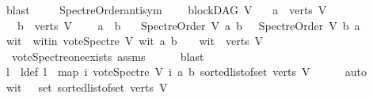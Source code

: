 \begin{isabellebody}
\ blast\ \isanewline
\ \ \isamarkupfalse%
\isanewline
{}\isamarkupfalse%
%
\endisatagproof
{\isafoldproof}%
%
\isadelimproof
\isanewline
%
\endisadelimproof
\isanewline
{}\isamarkupfalse%
\ Spectre{\isacharunderscore}{\kern0pt}Order{\isacharunderscore}{\kern0pt}antisym{\isacharcolon}{\kern0pt}\ \isanewline
\ \ \ {\isachardoublequoteopen}blockDAG\ V{\isachardoublequoteclose}\isanewline
\ \ \ {\isachardoublequoteopen}a\ {\isasymin}\ verts\ V{\isachardoublequoteclose}\ \isanewline
\ \ \ {\isachardoublequoteopen}b\ {\isasymin}\ verts\ V{\isachardoublequoteclose}\ \isanewline
\ \ \ {\isachardoublequoteopen}a\ {\isasymnoteq}\ b{\isachardoublequoteclose}\isanewline
\ \ \ {\isachardoublequoteopen}Spectre{\isacharunderscore}{\kern0pt}Order\ V\ a\ b\ {\isacharequal}{\kern0pt}\ {\isacharparenleft}{\kern0pt}{\isasymnot}\ {\isacharparenleft}{\kern0pt}Spectre{\isacharunderscore}{\kern0pt}Order\ V\ b\ a{\isacharparenright}{\kern0pt}{\isacharparenright}{\kern0pt}{\isachardoublequoteclose}\isanewline
%
\isadelimproof
%
\endisadelimproof
%
\isatagproof
{}\isamarkupfalse%
\ {\isacharminus}{\kern0pt}\isanewline
\ \ \isamarkupfalse%
\ wit\ \ wit{\isacharunderscore}{\kern0pt}in{\isacharcolon}{\kern0pt}\ {\isachardoublequoteopen}vote{\isacharunderscore}{\kern0pt}Spectre\ V\ wit\ a\ b\ {\isasymnoteq}\ {}\ {\isasymand}\ wit\ {\isasymin}\ verts\ V{\isachardoublequoteclose}\ \isanewline
\ \ \ \ \isamarkupfalse%
\ \ vote{\isacharunderscore}{\kern0pt}Spectre{\isacharunderscore}{\kern0pt}one{\isacharunderscore}{\kern0pt}exists\ assms\isanewline
\ \ \ \ \isamarkupfalse%
\ blast\ \isanewline
\ \ \isamarkupfalse%
\ l\ \ l{\isacharunderscore}{\kern0pt}def{\isacharcolon}{\kern0pt}\ {\isachardoublequoteopen}l\ {\isacharequal}{\kern0pt}\ {\isacharparenleft}{\kern0pt}map\ {\isacharparenleft}{\kern0pt}{\isasymlambda}i{\isachardot}{\kern0pt}\ vote{\isacharunderscore}{\kern0pt}Spectre\ V\ i\ a\ b{\isacharparenright}{\kern0pt}\ {\isacharparenleft}{\kern0pt}sorted{\isacharunderscore}{\kern0pt}list{\isacharunderscore}{\kern0pt}of{\isacharunderscore}{\kern0pt}set\ {\isacharparenleft}{\kern0pt}verts\ V{\isacharparenright}{\kern0pt}{\isacharparenright}{\kern0pt}{\isacharparenright}{\kern0pt}{\isachardoublequoteclose}\isanewline
\ \ \ \ \isamarkupfalse%
\ auto\isanewline
\ \ \isamarkupfalse%
\ {\isachardoublequoteopen}wit\ {\isasymin}\ \ set\ {\isacharparenleft}{\kern0pt}sorted{\isacharunderscore}{\kern0pt}list{\isacharunderscore}{\kern0pt}of{\isacharunderscore}{\kern0pt}set\ {\isacharparenleft}{\kern0pt}verts\ V{\isacharparenright}{\kern0pt}{\isacharparenright}{\kern0pt}{\isachardoublequoteclose}\ \isanewline

\end{isabellebody}
